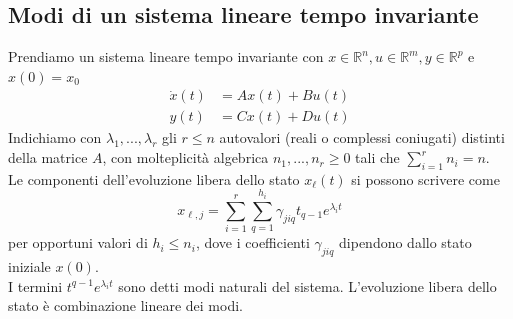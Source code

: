 \documentclass{article}
\numberwithin{equation}{subsection}
\let\oldsubsection\subsection%
\renewcommand{\subsection}{%
  \renewcommand{\theequation}{\thesubsection.\arabic{equation}}%
  \oldsubsection}%
\begin{document}
\subsection{Modi di un sistema lineare tempo invariante}
Prendiamo un sistema lineare tempo invariante con $x \in \mathbb{R}^n, u \in \mathbb{R}^m, y \in \mathbb{R}^p$ e $x(0)=x_0$
\begin{align*}
    \dot x(t) &= A x(t) + B u(t)\\
    y(t) &= C x(t) + D u(t)
\end{align*}
Indichiamo con $\lambda_1,...,\lambda_r$ gli $r \leq n$ autovalori (reali o complessi coniugati) distinti della matrice $A$, con molteplicità algebrica $n_1,...,n_r \geq 0$ tali che $\sum\limits ^r_{i=1} n_i = n$.\\
Le componenti dell'evoluzione libera dello stato $x_\ell(t)$ si possono scrivere come
\begin{equation}
    x_{\ell,j} = \sum^r_{i=1}\sum^{h_i}_{q=1} \gamma_{jiq}t_{q-1}e^{\lambda_i t} \tag*{$j=1,...,n$}
\end{equation}
per opportuni valori di $h_i \leq n_i$, dove i coefficienti $\gamma_{jiq}$ dipendono dallo stato iniziale $x(0)$.\\
I termini $t^{q-1}e^{\lambda_i t}$  sono detti modi naturali del sistema.
L'evoluzione libera dello stato è combinazione lineare dei modi.
\end{document}
